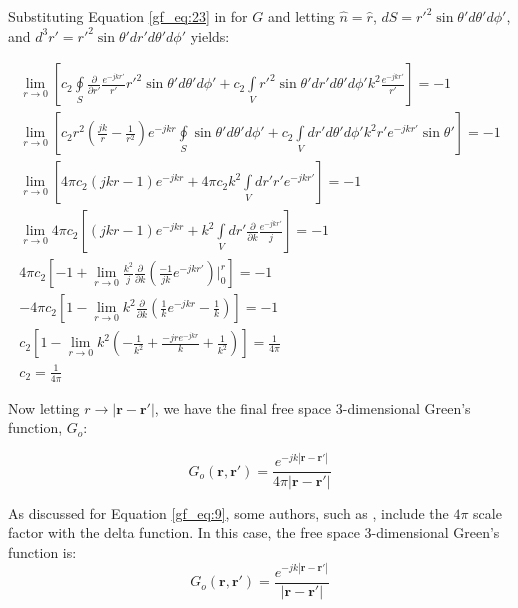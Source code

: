 Substituting Equation \ref{gf_eq:23} in for $G$ and letting $\hat{n} = \hat{r}$, $dS = r'^2\sin{\theta'}d\theta' d\phi'$, and  $d^3r' = r'^2\sin{\theta'}dr'd\theta' d\phi'$ yields:

\begin{equation}
\begin{gathered}
\lim_{r\to0}\left[c_2\oint\limits_{S}\frac{\partial }{\partial r'}\frac{e^{-jkr'}}{r'} r'^2\sin{\theta'} d\theta' d\phi '+ c_2\int\limits_{V}r'^2 \sin{\theta'}dr' d\theta' d\phi' k^2\frac{e^{-jkr'}}{r'}\right] = -1 \\
\lim_{r\to0}\left[c_2 r^2\left( \frac{jk}{r} - \frac{1}{r^2}\right)e^{-jkr}\oint\limits_{S}\sin{\theta'} d\theta' d\phi' + c_2\int\limits_{V}dr' d\theta' d\phi' k^2r'e^{-jkr'}\sin{\theta'}\right] = -1 \\
\lim_{r\to0}\left[4\pi c_2 \left( jkr - 1\right)e^{-jkr}+ 4\pi c_2k^2\int\limits_{V}dr' r'e^{-jkr'}\right] = -1 \\
\lim_{r\to0}4\pi c_2\left[\left( jkr - 1\right)e^{-jkr}+ k^2\int\limits_{V}dr' \frac{\partial}{\partial k}\frac{e^{-jkr'}}{j}\right] = -1 \\
4\pi c_2\left[-1 +  \lim_{r\to0}\frac{k^2}{j}\frac{\partial}{\partial k}\left( \frac{-1}{jk}e^{-jkr'}\right)\bigg|_0^{r}  \right] = -1 \\
-4\pi c_2\left[1 - \lim_{r\to0}k^2\frac{\partial}{\partial k}\left( \frac{1}{k}e^{-jkr} - \frac{1}{k}\right) \right] = -1 \\
c_2\left[1 - \lim_{r\to0}k^2\left(-\frac{1}{k^2}+\frac{-jre^{-jkr}}{k}+\frac{1}{k^2}\right) \right] = \frac{1}{4\pi} \\
 c_2 = \frac{1}{4\pi}
\end{gathered}
\label{gf_eq:25}
\end{equation}
\renewcommand{\baselinestretch}{2} \small\normalsize

Now letting $r \rightarrow |\mathbf{r}-\mathbf{r}'|$, we have the final free space 3-dimensional Green's function, $G_o$:

\begin{equation}
\boxed{G_o\left(\mathbf{r},\mathbf{r}'\right) = \frac{e^{-jk|\mathbf{r} - \mathbf{r}'|}}{4\pi |\mathbf{r} - \mathbf{r}'|}}
\label{gf_eq:26}
\end{equation}
\renewcommand{\baselinestretch}{2} \small\normalsize

As discussed for Equation \ref{gf_eq:9}, some authors, such as \cite{jackson_classical_em}, include the $4\pi$ scale factor with the delta function. In this case, the free space 3-dimensional Green's function is:
\begin{equation}
G_o\left(\mathbf{r},\mathbf{r}'\right)  = \frac{e^{-jk|\mathbf{r} - \mathbf{r}'|}}{|\mathbf{r} - \mathbf{r}'|}
\label{gf_eq:27}
\end{equation}
\renewcommand{\baselinestretch}{2} \small\normalsize

